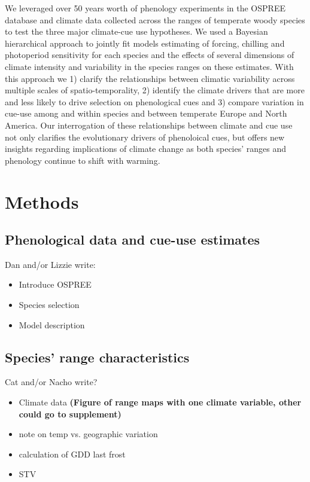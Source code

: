\documentclass[12pt]{article}\usepackage[]{graphicx}\usepackage[]{color}
\begin{document}
We leveraged over 50 years worth of phenology experiments in the OSPREE database \citep{} and climate data collected across the ranges of temperate woody species to test the three major climate-cue use hypotheses. We used a Bayesian hierarchical approach to jointly fit models estimating of forcing, chilling and photoperiod sensitivity for each species and the effects of several dimensions of climate intensity and variability in the species ranges on these estimates. With this approach we 1) clarify the relationships between climatic variability across multiple scales of spatio-temporality, 2) identify the climate drivers that are more and less likely to drive selection on phenological cues and 3) compare variation in cue-use among and within species and between temperate Europe and North America. Our interrogation of these relationships between climate and cue use not only clarifies the evolutionary drivers of phenoloical cues, but offers new insights regarding implications of climate change as both species' ranges and phenology continue to shift with warming.

\section*{Methods}
\subsection*{Phenological data and cue-use estimates}
Dan and/or Lizzie write:
\begin{itemize}
\item Introduce OSPREE
\item Species selection
\item Model description
\end{itemize}

\subsection*{Species' range characteristics}
Cat and/or Nacho write?\\
\begin{itemize}
\item Climate data \textbf{(Figure of range maps with one climate variable, other could go to supplement)}
\item note on temp vs. geographic variation
\item calculation of GDD last frost
\item STV

\end{itemize}
\end{document}
